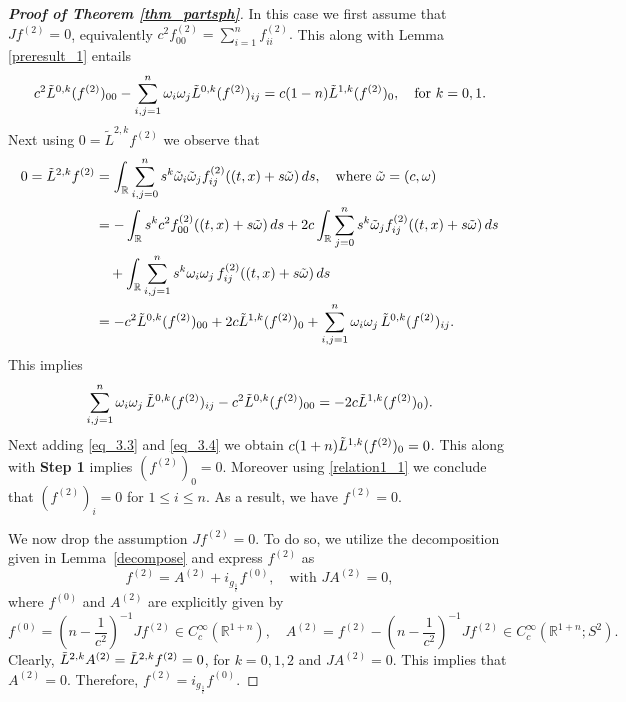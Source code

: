 \documentclass[11pt,a4paper,reqno]{amsart}
\newcommand{\qum}[1]{\quad\mbox{#1}}
\newcommand{\R}{\mathbb{R}}
\begin{document}
\begin{proof}[\textbf{Proof of Theorem \ref{thm_partsph}}]
		In this case we first assume that $Jf^{(2)}=0$, equivalently $c^2f^{(2)}_{00}=\sum_{i=1}^{n}f^{(2)}_{ii}.$ This along with Lemma \ref{preresult_1} entails
		\begin{align}\label{eq_3.4}
			c^2\Tilde{L}^{0,k}(f^{(2)})_{00}-\sum_{i,j=1}^{n}\omega_i \omega_j\Tilde{L}^{0,k}(f^{(2)})_{ij}= c(1-n)\Tilde{L}^{1,k}(f^{(2)})_0,\quad \text{for }k=0,1.
		\end{align}
		Next using $	0=\tilde{L}^{2,k} f^{(2)}$  we observe that	\begin{align*}
			0=	\tilde{L}^{2,k} f^{(2)}&= \int_\R \sum_{i,j=0}^{n} s^k \tilde{\omega}_i\tilde{\omega}_j f^{(2)}_{ij} ((t,x) +s\tilde{\omega})\, ds, \qum{where $\tilde{\omega}=(c,\omega)$}\\
			&= -\int_\R s^k c^2 f^{(2)}_{00} ((t,x) +s\tilde{\omega})\, ds + 2 c \int_\R\sum_{j=0}^n s^k \tilde{\omega}_j f^{(2)}_{ij} ((t,x) +s\tilde{\omega})\, ds \\&\quad
			+  \int_\R \sum_{i,j=1}^{n} s^k  \omega_i\omega_j \, f^{(2)}_{ij} ((t,x) +s\tilde{\omega})\, ds\\
			&= 	-c^2\Tilde{L}^{0,k}(f^{(2)})_{00} +2c 	\Tilde{L}^{1,k}(f^{(2)})_{0} + \sum_{i,j=1}^{n} \omega_i\omega_j \, \Tilde{L}^{0,k}(f^{(2)})_{ij}.
		\end{align*}
		This implies 
		\begin{align}\label{eq_3.3}
			\sum_{i,j=1}^{n} \omega_i\omega_j \, \Tilde{L}^{0,k}(f^{(2)})_{ij}-c^2\Tilde{L}^{0,k}(f^{(2)})_{00} =-2c 	\Tilde{L}^{1,k}(f^{(2)})_{0}).
		\end{align}
	Next adding \eqref{eq_3.3} and \eqref{eq_3.4} we obtain  $c(1+n) \Tilde{L}^{1,k}(f^{(2)})_{0}=0$.
		This along with \textbf{Step 1} implies $ (f^{(2)})_0=0$. Moreover using \eqref{relation1_1} we conclude that $ (f^{(2)})_i=0$ for $1\le i \le  n$. As a result, we have  $f^{(2)}=0$.
		
		We now drop the assumption $J f^{(2)}=0$. To do so,  we utilize the decomposition given in Lemma~\ref{decompose} and express $f^{(2)}$ as
		\begin{equation*}
			f^{(2)} = A^{(2)} + i_{g_{\frac{1}{c}}} f^{(0)},
			\quad \text{with } JA^{(2)}=0,
		\end{equation*}
		where $f^{(0)}$ and $A^{(2)}$ are explicitly given by
		\begin{equation*}
			f^{(0)} =  (n-{\frac{1}{c^2}})^{-1} Jf^{(2)} \in C_{c}^{\infty}(\mathbb{R}^{1+n}),\quad
		A^{(2)} =f^{(2)}-(n-{\frac{1}{c^2}})^{-1} J f^{(2)}  \in C_{c}^{\infty}(\mathbb{R}^{1+n};S^2).
		\end{equation*}
		Clearly, $\Tilde{L}^{2,k}A^{(2)}=\Tilde{L}^{2,k}f^{(2)}=0$, for $k=0,1,2$ and $JA^{(2)}=0$. This implies that $A^{(2)}=0.$ Therefore, $f^{(2)}=i_{g_{\frac{1}{c}}}f^{(0)}$.\smallskip
		

\end{proof}
\end{document}
